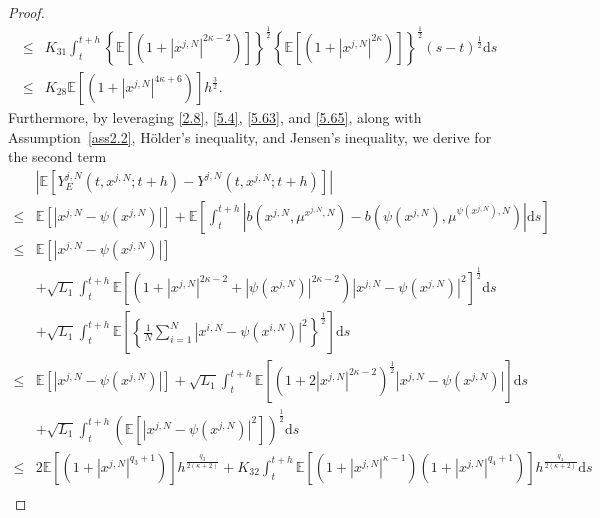 \documentclass[12pt]{article}
\numberwithin{equation}{section}
\begin{document}
\begin{proof}
\begin{equation}
\begin{aligned}
\leq & K_{31} \int_t^{t+h}\left\{\mathbb{E}\left[\left(1+\left|x^{j,N}\right|^{2\kappa-2}\right)\right]\right\}^{\frac{1}{2}}\left\{\mathbb{E}\left[\left(1+\left|x^{j,N}\right|^{2\kappa}\right)\right]\right\}^{\frac{1}{2}}\left(s-t\right)^{\frac{1}{2}} \mathrm{d} s \\
\leq&  K_{28}\mathbb{E}\left[\left(1+\left|x^{j,N}\right|^{4 \kappa+6}\right) \right]h^{\frac{3}{2}}.
\end{aligned}
\end{equation}
Furthermore, by leveraging \eqref{2.8}, \eqref{5.4}, \eqref{5.63}, and \eqref{5.65}, along with Assumption~\ref{ass2.2}, H\"older's inequality, and Jensen's inequality, we  derive  for  the second term 
\begin{equation}\tag{5.100}\label{5.72}
\begin{aligned}
& \left|\mathbb{E}\left[Y^{j,N}_{E}\left(t, x^{j,N} ; t+h\right)-Y^{j,N}\left(t, x^{j,N}; t+h\right)\right]\right| \\
\leq& \mathbb{E}\left[\left|x^{j,N}-\psi\left(x^{j,N}\right)\right|\right]+\mathbb{E}\left[\int_t^{t+h}\left| b\left( x^{j,N},\mu ^{x^{j,N},N} \right)-b\left( \psi\left(x^{j,N}\right),\mu ^{\psi\left(x^{j,N}\right),N} \right)\right|\mathrm{d} s\right]\\
\leq &\mathbb{E}\left[\left|x^{j,N}-\psi\left(x^{j,N}\right)\right|\right]\\
&+\sqrt{L_1} \int_t^{t+h} \mathbb{E}\left[ \left( 1+\left|x^{j,N}\right|^{2\kappa -2}+\left|\psi\left(x^{j,N}\right)\right|^{2\kappa -2} \right) \left|x^{j,N}-\psi\left(x^{j,N}\right)\right|^2\right] ^{\frac{1}{2}}\mathrm{d} s\\
&+\sqrt{L_1} \int_t^{t+h} \mathbb{E}\left[\left\{\tfrac{1}{N}\sum_{i=1}^N{\left|x^{i,N}-\psi\left(x^{i,N}\right)\right|^2}\right\}^{\frac{1}{2}}\right] \mathrm{d} s\\
\leq &\mathbb{E}\left[\left|x^{j,N}-\psi\left(x^{j,N}\right)\right|\right]+\sqrt{L_1} \int_t^{t+h} \mathbb{E}\left[ \left( 1+2\left|x^{j,N}\right|^{2\kappa -2}\right)^{\frac{1}{2}} \left|x^{j,N}-\psi\left(x^{j,N}\right)\right|\right] 
\mathrm{d} s\\
&+\sqrt{L_1}\int_t^{t+h} \left(\mathbb{E}\left[\left|x^{j,N}-\psi\left(x^{j,N}\right)\right|^2\right] \right)^{\frac{1}{2}}\mathrm{d} s\\
\leq&2\mathbb{E}\left[\left(1+\left|x^{j,N}\right|^{q_{3}+1}\right)\right] h^{\frac{q_{3}}{2\left(\kappa+2\right)}}+K_{32} \int_t^{t+h} \mathbb{E}\left[\left(1+\left|x^{j,N}\right|^{\kappa -1}\right)\left(1+\left|x^{j,N}\right|^{q_{4}+1}\right)\right]h^{\frac{q_{4}}{2\left(\kappa+2\right)}}\mathrm{d} s\\

\end{aligned}
\end{equation}
\end{proof}
\end{document}
